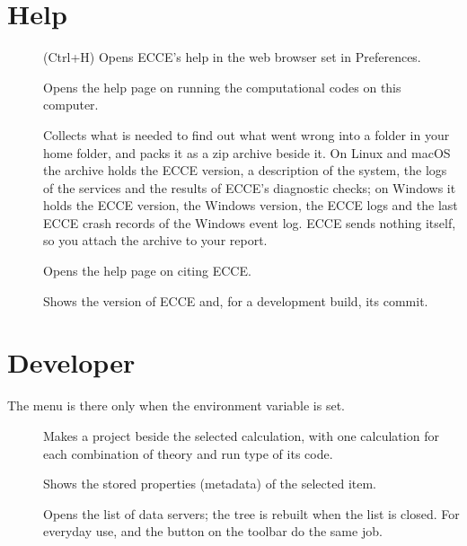 \section{Help}
\begin{description}
	\item[] (\textsf{Ctrl+H}) Opens ECCE's help in the web browser set in Preferences.
	\item[] Opens the help page on running the computational codes on this computer.
	\item[] Collects what is needed to find out what went wrong into a folder  in your home folder, and packs it as a zip archive beside it. On Linux and macOS the archive holds the ECCE version, a description of the system, the logs of the services and the results of ECCE's diagnostic checks; on Windows it holds the ECCE version, the Windows version, the ECCE logs and the last ECCE crash records of the Windows event log. ECCE sends nothing itself, so you attach the archive to your report.
	\item[] Opens the help page on citing ECCE.
	\item[] Shows the version of ECCE and, for a development build, its commit.
\end{description}

\section{Developer}
The  menu is there only when the environment variable  is set.
\begin{description}
	\item[] Makes a project  beside the selected calculation, with one calculation for each combination of theory and run type of its code.
	\item[] Shows the stored properties (metadata) of the selected item.
	\item[] Opens the list of data servers; the tree is rebuilt when the list is closed. For everyday use,  and the  button on the toolbar do the same job.
\end{description}

